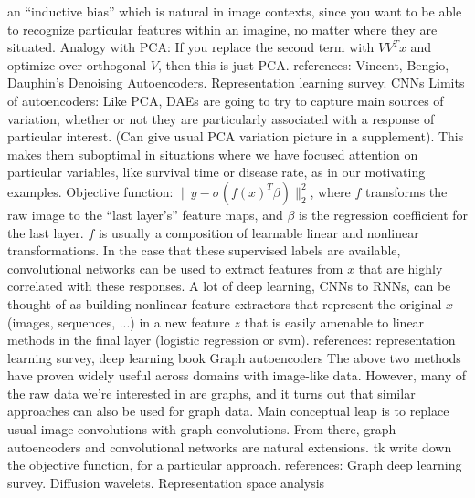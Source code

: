 \documentclass[11pt]{article}
\begin{document}
\begin{outline}
    an ``inductive bias'' which is natural in image contexts, since you want to
    be able to recognize particular features within an imagine, no matter where
    they are situated.
    \3 Analogy with PCA: If you replace the second term with $VV^{T}x$ and
    optimize over orthogonal $V$, then this is just PCA.
    \3 references: Vincent, Bengio, Dauphin's Denoising Autoencoders.
    Representation learning survey.
  \2 CNNs
    \3 Limits of autoencoders: Like PCA, DAEs are going to try to capture main
    sources of variation, whether or not they are particularly associated with a
    response of particular interest. (Can give usual PCA variation picture in a
    supplement). This makes them suboptimal in situations where we have focused
    attention on particular variables, like survival time or disease rate, as in
    our motivating examples.
    \3 Objective function: $\|y -
    \sigma\left(f\left(x\right)^{T}\beta\right)\|_{2}^{2}$, where $f$ transforms
    the raw image to the ``last layer's'' feature maps, and $\beta$ is the
    regression coefficient for the last layer. $f$ is usually a composition of
    learnable linear and nonlinear transformations.
    \3 In the case that these supervised labels are available, convolutional
    networks can be used to extract features from $x$ that are highly correlated
    with these responses. A lot of deep learning, CNNs to RNNs, can be thought
    of as building nonlinear feature extractors that represent the original $x$
    (images, sequences, ...) in a new feature $z$ that is easily amenable to
    linear methods in the final layer (logistic regression or svm).
    \3 references: representation learning survey, deep learning book
  \2 Graph autoencoders
    \3 The above two methods have proven widely useful across domains with
    image-like data. However, many of the raw data we're interested in are
    graphs, and it turns out that similar approaches can also be used for graph
    data.
    \3 Main conceptual leap is to replace usual image convolutions with graph
    convolutions. From there, graph autoencoders and convolutional networks are
    natural extensions.
    \3 tk write down the objective function, for a particular approach.
    \3 references: Graph deep learning survey. Diffusion wavelets.
  \2 Representation space analysis


\end{outline}
\end{document}
